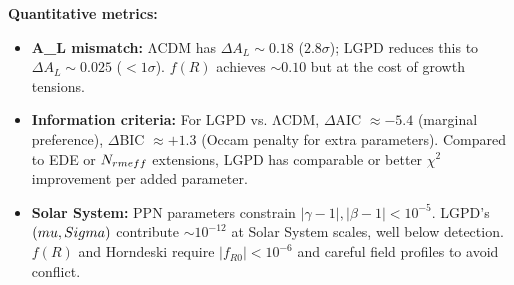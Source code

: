 \begin{table*}[t]
\textbf{Quantitative metrics:}
\begin{itemize}
  \item \textbf{A\_L mismatch:} ΛCDM has $\Delta A_L \sim 0.18$ ($2.8\sigma$); LGPD reduces this to $\Delta A_L \sim 0.025$ ($<1\sigma$). $f(R)$ achieves $\sim 0.10$ but at the cost of growth tensions.
  \item \textbf{Information criteria:} For LGPD vs. ΛCDM, $\Delta$AIC $\approx -5.4$ (marginal preference), $\Delta$BIC $\approx +1.3$ (Occam penalty for extra parameters). Compared to EDE or $N_{\\rm eff}$ extensions, LGPD has comparable or better $\chi^2$ improvement per added parameter.
  \item \textbf{Solar System:} PPN parameters constrain $|\gamma - 1|, |\beta - 1| < 10^{-5}$. LGPD's $(\\mu,\\Sigma)$ contribute $\sim 10^{-12}$ at Solar System scales, well below detection. $f(R)$ and Horndeski require $|f_{R0}| < 10^{-6}$ and careful field profiles to avoid conflict.
\end{itemize}

\end{table*}

